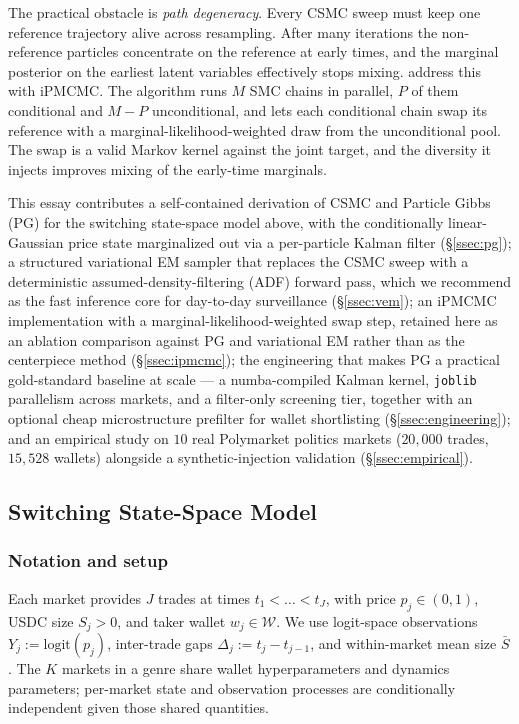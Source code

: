 The practical obstacle is \emph{path degeneracy}. Every CSMC sweep must keep one reference trajectory alive across resampling. After many iterations the non-reference particles concentrate on the reference at early times, and the marginal posterior on the earliest latent variables effectively stops mixing. \citet{rainforth2016interacting} address this with iPMCMC. The algorithm runs $M$ SMC chains in parallel, $P$ of them conditional and $M-P$ unconditional, and lets each conditional chain swap its reference with a marginal-likelihood-weighted draw from the unconditional pool. The swap is a valid Markov kernel against the joint target, and the diversity it injects improves mixing of the early-time marginals.

This essay contributes a self-contained derivation of CSMC and Particle Gibbs (PG) for the switching state-space model above, with the conditionally linear-Gaussian price state marginalized out via a per-particle Kalman filter (\S\ref{ssec:pg}); a structured variational EM sampler that replaces the CSMC sweep with a deterministic assumed-density-filtering (ADF) forward pass, which we recommend as the fast inference core for day-to-day surveillance (\S\ref{ssec:vem}); an iPMCMC implementation with a marginal-likelihood-weighted swap step, retained here as an ablation comparison against PG and variational EM rather than as the centerpiece method (\S\ref{ssec:ipmcmc}); the engineering that makes PG a practical gold-standard baseline at scale --- a numba-compiled Kalman kernel, \texttt{joblib} parallelism across markets, and a filter-only screening tier, together with an optional cheap microstructure prefilter for wallet shortlisting (\S\ref{ssec:engineering}); and an empirical study on $10$ real Polymarket politics markets ($20{,}000$ trades, $15{,}528$ wallets) alongside a synthetic-injection validation (\S\ref{ssec:empirical}).

\subsection{Switching State-Space Model}\label{ssec:model}

\subsubsection{Notation and setup}

Each market provides $J$ trades at times $t_1 < \dots < t_J$, with price $p_j \in (0,1)$, USDC size $S_j > 0$, and taker wallet $w_j \in \mathcal{W}$. We use logit-space observations $Y_j := \mathrm{logit}(p_j)$, inter-trade gaps $\Delta_j := t_j - t_{j-1}$, and within-market mean size $\bar S$. The $K$ markets in a genre share wallet hyperparameters and dynamics parameters; per-market state and observation processes are conditionally independent given those shared quantities.

